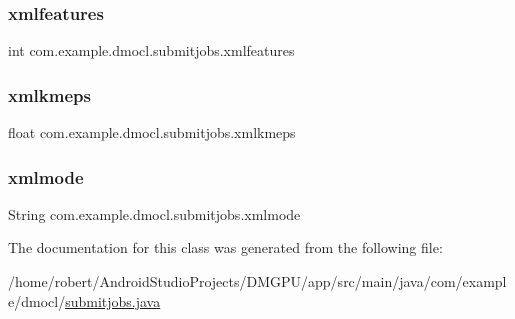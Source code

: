 \subsubsection{\texorpdfstring{xmlfeatures}{xmlfeatures}}
{\footnotesize\ttfamily int com.\+example.\+dmocl.\+submitjobs.\+xmlfeatures\hspace{0.3cm}{\ttfamily [private]}}

\mbox{\label{classcom_1_1example_1_1dmocl_1_1submitjobs_a7b94da0c02916628daa6d636d0b96e9c}} 
\subsubsection{\texorpdfstring{xmlkmeps}{xmlkmeps}}
{\footnotesize\ttfamily float com.\+example.\+dmocl.\+submitjobs.\+xmlkmeps\hspace{0.3cm}{\ttfamily [private]}}

\mbox{\label{classcom_1_1example_1_1dmocl_1_1submitjobs_af1a274972e8b51db020c0e8a36883497}} 
\subsubsection{\texorpdfstring{xmlmode}{xmlmode}}
{\footnotesize\ttfamily String com.\+example.\+dmocl.\+submitjobs.\+xmlmode\hspace{0.3cm}{\ttfamily [private]}}



The documentation for this class was generated from the following file\+:\begin{DoxyCompactItemize}
\item 
/home/robert/\+Android\+Studio\+Projects/\+D\+M\+G\+P\+U/app/src/main/java/com/example/dmocl/\mbox{\hyperlink{submitjobs_8java}{submitjobs.\+java}}\end{DoxyCompactItemize}

